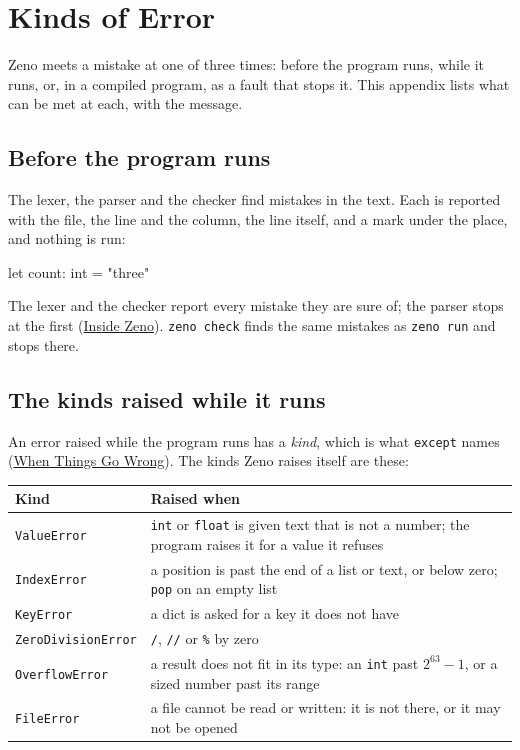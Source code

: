 \chapter{Kinds of Error}\label{app-error-kinds}

Zeno meets a mistake at one of three times: before the program runs,
while it runs, or, in a compiled program, as a fault that stops it.
This appendix lists what can be met at each, with the message.

\section{Before the program runs}

The lexer, the parser and the checker find mistakes in the text. Each
is reported with the file, the line and the column, the line itself,
and a mark under the place, and nothing is run:

\begin{zeno}[fails=yes]
let count: int = "three"
\end{zeno}

The lexer and the checker report every mistake they are sure of; the
parser stops at the first (\hyperref[ch-inside]{Inside Zeno}).
\verb|zeno check| finds the same mistakes as \verb|zeno run| and
stops there.

\section{The kinds raised while it runs}

An error raised while the program runs has a \emph{kind}, which is
what \verb|except| names (\hyperref[ch-errors]{When Things Go Wrong}).
The kinds Zeno raises itself are these:

\begin{longtable}{lP{8.8cm}}
\toprule
Kind & Raised when \\
\midrule
\endhead
\verb|ValueError| & \verb|int| or \verb|float| is given text that is not
  a number; the program raises it for a value it refuses \\
\verb|IndexError| & a position is past the end of a list or text, or
  below zero; \verb|pop| on an empty list \\
\verb|KeyError| & a dict is asked for a key it does not have \\
\verb|ZeroDivisionError| & \verb|/|, \verb|//| or \verb|%| by zero \\
\verb|OverflowError| & a result does not fit in its type: an \verb|int|
  past $2^{63}-1$, or a sized number past its range \\
\verb|FileError| & a file cannot be read or written: it is not there,
  or it may not be opened \\
\bottomrule
\end{longtable}

